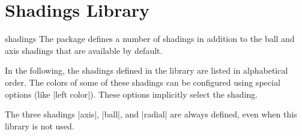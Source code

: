 %
%
%


\section{Shadings Library}
\label{section-library-shadings}

\begin{pgflibrary}{shadings}
    The package defines a number of shadings in addition to the ball and axis
    shadings that are available by default.
\end{pgflibrary}

In the following, the shadings defined in the library are listed in
alphabetical order. The colors of some of these shadings can be configured
using special options (like |left color|). These options implicitly select the
shading.

The three shadings |axis|, |ball|, and |radial| are always defined, even when
this library is not used.

